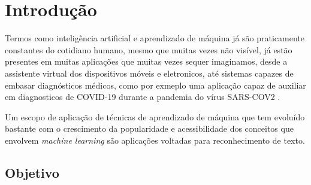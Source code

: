 
\chapter[Introdução]{Introdução}

Termos como inteligência artificial e aprendizado de máquina já são praticamente constantes do cotidiano humano, mesmo que muitas vezes não visível, já estão presentes em muitas aplicações que muitas vezes sequer imaginamos, desde a assistente virtual dos dispositivos móveis e eletronicos, até sistemas capazes de embasar diagnósticos médicos, como por exmeplo uma aplicação capaz de auxiliar em diagnosticos de COVID-19 durante a pandemia do vírus SARS-COV2 \cite{Zhao2021DeepLF}. 

Um escopo de aplicação de técnicas de aprendizado de máquina que tem evoluído bastante com o crescimento da popularidade e acessibilidade dos conceitos que envolvem \textit{machine learning} são aplicações voltadas para reconhecimento de texto.

\section{Objetivo}\label{sec:objetivos}

\lipsum[36]
